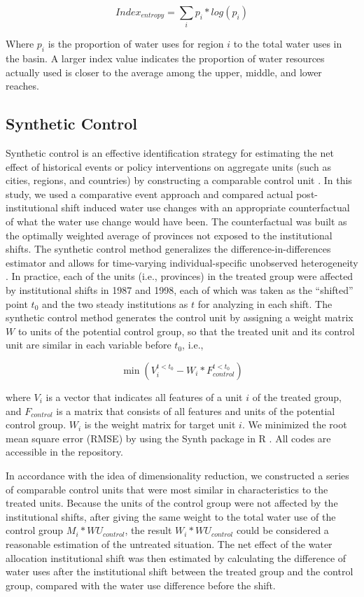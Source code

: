 \documentclass{nsr}
\begin{document}
$$ Index_{entropy} = \sum_i{p_i *log(p_i)} $$

Where $p_i$ is the proportion of water uses for region $i$ to the total water uses in the basin. A larger index value indicates the proportion of water resources actually used is closer to the average among the upper, middle, and lower reaches.

\subsection{Synthetic Control}
Synthetic control is an effective identification strategy for estimating the net effect of historical events or policy interventions on aggregate units (such as cities, regions, and countries) by constructing a comparable control unit \cite{abadieSyntheticControlMethods2010}.
In this study, we used a comparative event approach and compared actual post-institutional shift induced water use changes with an appropriate counterfactual of what the water use change would have been.
The counterfactual was built as the optimally weighted average of provinces not exposed to the institutional shifts.
The synthetic control method generalizes the difference-in-differences estimator and allows for time-varying individual-specific unobserved heterogeneity \cite{billmeierAssessingEconomicLiberalization2013, smithresourcecurseexorcised2015}.
In practice, each of the units (i.e., provinces) in the treated group were affected by institutional shifts in 1987 and 1998, each of which was taken as the “shifted” point $t_0$ and the two steady institutions as $t$ for analyzing in each shift. The synthetic control method generates the control unit by assigning a weight matrix $W$ to units of the potential control group, so that the treated unit and its control unit are similar in each variable before $t_0$, i.e.,

$$\min(V_{i}^{t<t_0} - W_i * F_{control}^{t<t_0})$$

where $V_i$ is a vector that indicates all features of a unit $i$ of the treated group, and $F_{control}$ is a matrix that consists of all features and units of the potential control group. $W_i$ is the weight matrix for target unit $i$. We minimized the root mean square error (RMSE) by using the Synth package in R \cite{abadieSynthPackageSynthetic2011, abadieComparativePoliticsSynthetic2015}. All codes are accessible in the repository.

In accordance with the idea of dimensionality reduction, we constructed a series of comparable control units that were most similar in characteristics to the treated units. Because the units of the control group were not affected by the institutional shifts, after giving the same weight to the total water use of the control group $M_i * WU_{control}$, the result $W_i*WU_{control}$ could be considered a reasonable estimation of the untreated situation. The net effect of the water allocation institutional shift was then estimated by calculating the difference of water uses after the institutional shift between the treated group and the control group, compared with the water use difference before the shift.
\end{document}
